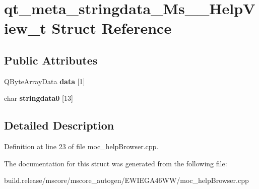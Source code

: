 \hypertarget{structqt__meta__stringdata___ms_____help_view__t}{}\section{qt\+\_\+meta\+\_\+stringdata\+\_\+\+Ms\+\_\+\+\_\+\+Help\+View\+\_\+t Struct Reference}
\label{structqt__meta__stringdata___ms_____help_view__t}
\subsection*{Public Attributes}
\begin{DoxyCompactItemize}
\item 
\mbox{\label{structqt__meta__stringdata___ms_____help_view__t_af4a75d6bc02984ed3fab76f7a5ef0627}} 
Q\+Byte\+Array\+Data {\bfseries data} \mbox{[}1\mbox{]}
\item 
\mbox{\label{structqt__meta__stringdata___ms_____help_view__t_a5416126e9a5e8bfe9cd6cd0e36b0adc9}} 
char {\bfseries stringdata0} \mbox{[}13\mbox{]}
\end{DoxyCompactItemize}


\subsection{Detailed Description}


Definition at line 23 of file moc\+\_\+help\+Browser.\+cpp.



The documentation for this struct was generated from the following file\+:\begin{DoxyCompactItemize}
\item 
build.\+release/mscore/mscore\+\_\+autogen/\+E\+W\+I\+E\+G\+A46\+W\+W/moc\+\_\+help\+Browser.\+cpp\end{DoxyCompactItemize}
